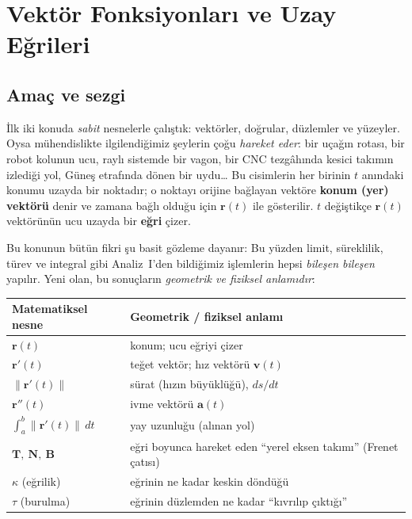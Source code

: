 \section{Vektör Fonksiyonları ve Uzay Eğrileri}

\subsection{Amaç ve sezgi}

İlk iki konuda \emph{sabit} nesnelerle çalıştık: vektörler, doğrular, düzlemler ve yüzeyler. Oysa mühendislikte
ilgilendiğimiz şeylerin çoğu \emph{hareket eder}: bir uçağın rotası, bir robot kolunun ucu, raylı sistemde bir vagon,
bir CNC tezgâhında kesici takımın izlediği yol, Güneş etrafında dönen bir uydu\dots{} Bu cisimlerin her birinin $t$
anındaki konumu uzayda bir noktadır; o noktayı orijine bağlayan vektöre \textbf{konum (yer) vektörü} denir ve zamana bağlı
olduğu için $\mathbf r(t)$ ile gösterilir. $t$ değiştikçe $\mathbf r(t)$ vektörünün ucu uzayda bir \textbf{eğri} çizer.

Bu konunun bütün fikri şu basit gözleme dayanır:  Bu yüzden limit, süreklilik, türev ve integral gibi Analiz~I'den bildiğimiz işlemlerin hepsi
\emph{bileşen bileşen} yapılır. Yeni olan, bu sonuçların \emph{geometrik ve fiziksel anlamıdır}:

\begin{center}
\begin{tabular}{l l}
\toprule
Matematiksel nesne & Geometrik / fiziksel anlamı \\
\midrule
$\mathbf r(t)$ & konum; ucu eğriyi çizer \\
$\mathbf r'(t)$ & teğet vektör; hız vektörü $\mathbf v(t)$ \\
$\|\mathbf r'(t)\|$ & sürat (hızın büyüklüğü), $ds/dt$ \\
$\mathbf r''(t)$ & ivme vektörü $\mathbf a(t)$ \\
$\int_a^b\|\mathbf r'(t)\|\,dt$ & yay uzunluğu (alınan yol) \\
$\mathbf T,\ \mathbf N,\ \mathbf B$ & eğri boyunca hareket eden ``yerel eksen takımı'' (Frenet çatısı) \\
$\kappa$ (eğrilik) & eğrinin ne kadar keskin döndüğü \\
$\tau$ (burulma) & eğrinin düzlemden ne kadar ``kıvrılıp çıktığı'' \\
\bottomrule
\end{tabular}
\end{center}

